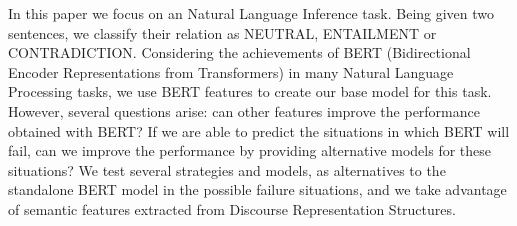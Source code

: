 
In this paper we focus on an Natural Language Inference task. Being given two sentences, we classify their relation as NEUTRAL, ENTAILMENT or CONTRADICTION. Considering the achievements of BERT (Bidirectional Encoder Representations from Transformers) in many Natural Language Processing tasks, we use BERT features to create our base model for this task. However, several questions arise: can other features improve the performance obtained with BERT? If we are able to predict the situations in which BERT will fail, can we improve the performance by providing alternative models for these situations? We test several strategies and models, as alternatives to the standalone BERT model in the possible failure situations, and we take advantage of semantic features extracted from Discourse Representation Structures.


